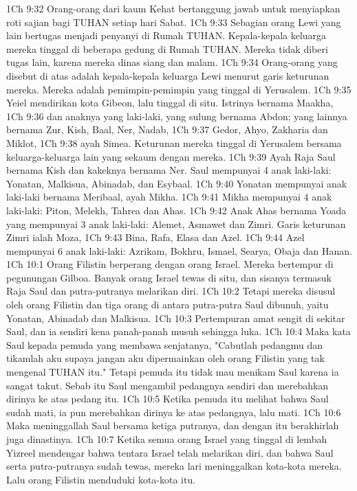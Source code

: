 1Ch 9:32  Orang-orang dari kaum Kehat bertanggung jawab untuk menyiapkan roti sajian bagi TUHAN setiap hari Sabat.
1Ch 9:33  Sebagian orang Lewi yang lain bertugas menjadi penyanyi di Rumah TUHAN. Kepala-kepala keluarga mereka tinggal di beberapa gedung di Rumah TUHAN. Mereka tidak diberi tugas lain, karena mereka dinas siang dan malam.
1Ch 9:34  Orang-orang yang disebut di atas adalah kepala-kepala keluarga Lewi menurut garis keturunan mereka. Mereka adalah pemimpin-pemimpin yang tinggal di Yerusalem.
1Ch 9:35  Yeiel mendirikan kota Gibeon, lalu tinggal di situ. Istrinya bernama Maakha,
1Ch 9:36  dan anaknya yang laki-laki, yang sulung bernama Abdon; yang lainnya bernama Zur, Kish, Baal, Ner, Nadab,
1Ch 9:37  Gedor, Ahyo, Zakharia dan Miklot,
1Ch 9:38  ayah Simea. Keturunan mereka tinggal di Yerusalem bersama keluarga-keluarga lain yang sekaum dengan mereka.
1Ch 9:39  Ayah Raja Saul bernama Kish dan kakeknya bernama Ner. Saul mempunyai 4 anak laki-laki: Yonatan, Malkisua, Abinadab, dan Esybaal.
1Ch 9:40  Yonatan mempunyai anak laki-laki bernama Meribaal, ayah Mikha.
1Ch 9:41  Mikha mempunyai 4 anak laki-laki: Piton, Melekh, Tahrea dan Ahas.
1Ch 9:42  Anak Ahas bernama Yoada yang mempunyai 3 anak laki-laki: Alemet, Asmawet dan Zimri. Garis keturunan Zimri ialah Moza,
1Ch 9:43  Bina, Rafa, Elasa dan Azel.
1Ch 9:44  Azel mempunyai 6 anak laki-laki: Azrikam, Bokhru, Ismael, Searya, Obaja dan Hanan.
1Ch 10:1  Orang Filistin berperang dengan orang Israel. Mereka bertempur di pegunungan Gilboa. Banyak orang Israel tewas di situ, dan sisanya termasuk Raja Saul dan putra-putranya melarikan diri.
1Ch 10:2  Tetapi mereka disusul oleh orang Filistin dan tiga orang di antara putra-putra Saul dibunuh, yaitu Yonatan, Abinadab dan Malkisua.
1Ch 10:3  Pertempuran amat sengit di sekitar Saul, dan ia sendiri kena panah-panah musuh sehingga luka.
1Ch 10:4  Maka kata Saul kepada pemuda yang membawa senjatanya, "Cabutlah pedangmu dan tikamlah aku supaya jangan aku dipermainkan oleh orang Filistin yang tak mengenal TUHAN itu." Tetapi pemuda itu tidak mau menikam Saul karena ia sangat takut. Sebab itu Saul mengambil pedangnya sendiri dan merebahkan dirinya ke atas pedang itu.
1Ch 10:5  Ketika pemuda itu melihat bahwa Saul sudah mati, ia pun merebahkan dirinya ke atas pedangnya, lalu mati.
1Ch 10:6  Maka meninggallah Saul bersama ketiga putranya, dan dengan itu berakhirlah juga dinastinya.
1Ch 10:7  Ketika semua orang Israel yang tinggal di lembah Yizreel mendengar bahwa tentara Israel telah melarikan diri, dan bahwa Saul serta putra-putranya sudah tewas, mereka lari meninggalkan kota-kota mereka. Lalu orang Filistin menduduki kota-kota itu.
